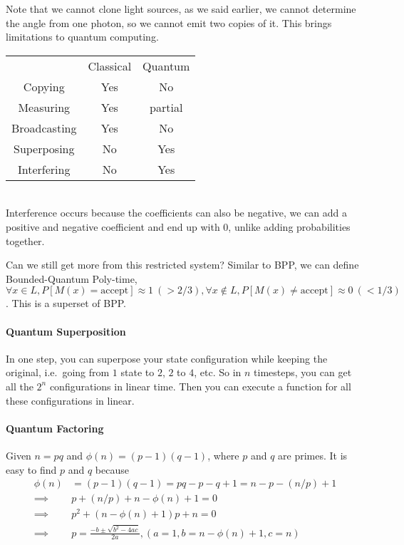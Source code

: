 \documentclass[12 pt]{article}
\begin{document}
Note that we cannot clone light sources, as we said earlier, we cannot
determine the angle from one photon, so we cannot emit two copies of
it. This brings limitations to quantum computing.\\
\begin{tabular}{c c c}
  &Classical&Quantum
  \\ Copying & Yes & No
  \\ Measuring & Yes & partial
  \\ Broadcasting & Yes & No
  \\ Superposing & No & Yes
  \\ Interfering & No & Yes
\end{tabular}
\\ Interference occurs because the coefficients can also be negative,
we can add a positive and negative coefficient and end up with $0$,
unlike adding probabilities together.

Can we still get more from this restricted system? Similar to BPP, we
can define Bounded-Quantum Poly-time, $\forall x \in L,
P[M(x)=\text{accept}] \approx 1\ (> 2/3), \forall x \notin L, P[M(x)
\neq \text{accept}] \approx 0\ (< 1/3)$. This is a superset of BPP.

\paragraph{Quantum Superposition}
In one step, you can superpose your state configuration while keeping the
original, i.e.\ going from $1$ state to $2$, $2$ to $4$, etc. So in
$n$ timesteps, you can get all the $2^n$ configurations in linear
time. Then you can execute a function for all these configurations in
linear.
\paragraph{Quantum Factoring}
Given $n=pq$ and $\phi(n)=(p-1)(q-1)$, where $p$ and $q$ are
primes. It is easy to find $p$ and $q$ because
\begin{align*}
  \phi(n) &=
            (p-1)(q-1)=pq-p-q+1 = n-p-(n/p)+1
  \\ \implies & p +(n/p) +n - \phi(n) + 1 = 0
  \\ \implies & p^2 + (n-\phi(n) + 1)p+n = 0
  \\ \implies & p = \frac{-b \pm \sqrt{b^2 - 4ac}}{2a}, (a=1, b =n
                -\phi(n)+1, c=n)
\end{align*}
\end{document}
